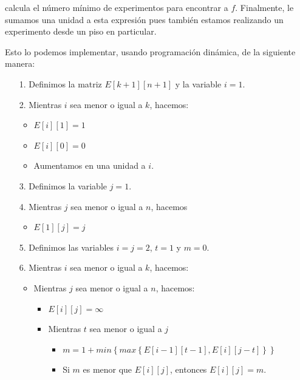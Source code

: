 \documentclass[letterpaper,11pt]{article}
\begin{document}
\begin{enumerate}
    calcula el número mínimo de experimentos para encontrar a $f$. 
    Finalmente, le sumamos una unidad a esta expresión pues también 
    estamos realizando un experimento desde un piso en particular.

    Esto lo podemos implementar, usando programación dinámica, de la siguiente 
    manera: 
    \begin{itemize}
        \item[1.] Definimos la matriz $E[k+1][n+1]$ y la variable $i=1$.

        \item[2.] Mientras $i$ sea menor o igual a $k$, hacemos:
        \begin{itemize}
            \item $E[i][1] = 1$
            \item $E[i][0] = 0$
            \item Aumentamos en una unidad a $i$.
        \end{itemize}

        \item[3.] Definimos la variable $j = 1$.
        
        \item[4.] Mientras $j$ sea menor o igual a $n$, hacemos 
        \begin{itemize}
            \item $E[1][j] = j$
        \end{itemize}

        \item[5.] Definimos las variables $i = j = 2$, $t = 1$ y $m = 0$.

        \item[6.] Mientras $i$ sea menor o igual a $k$, hacemos:
        \begin{itemize}
            \item Mientras $j$ sea menor o igual a $n$, hacemos:
            \begin{itemize}
                \item $E[i][j] = \infty$

                \item Mientras $t$ sea menor o igual a $j$
                \begin{itemize}
                    \item 
                    $m = 1 + 
                    min\left\{max\left\{E[i-1][t-1], E[i][j-t]\right\}\right\}$

                    \item Si $m$ es menor que $E[i][j]$, entonces $E[i][j] = m$.


\end{itemize}
\end{itemize}
\end{itemize}
\end{itemize}
\end{enumerate}
\end{document}
